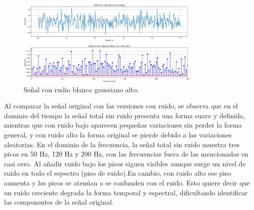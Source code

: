 \bigskip
\begin{figure}[H]
\centering
\includegraphics[width=0.8\textwidth]{parte_teorica/senalconruidoalto.png}
\caption{Señal con rudio blanco gaussiano alto.}
\end{figure}
\bigskip


Al comparar la señal original con las versiones con ruido, se observa que en el dominio del tiempo la señal total sin ruido presenta una forma suave y definida, mientras que con ruido bajo aparecen pequeñas variaciones sin perder la forma general, y con ruido alto la forma original se pierde debido a las variaciones aleatorias. En el dominio de la frecuencia, la señal total sin ruido muestra tres picos en 50 Hz, 120 Hz y 200 Hz, con las frecuencias fuera de las mencionadas en casi cero. Al añadir ruido bajo los picos siguen visibles aunque surge un nivel de ruido en todo el espectro (piso de ruido).En cambio, con ruido alto ese piso aumenta y los picos se atenúan o se confunden con el ruido. Esto quiere decir que un ruido creciente degrada la forma temporal y espectral, dificultando identificar las componentes de la señal original.

\bigskip